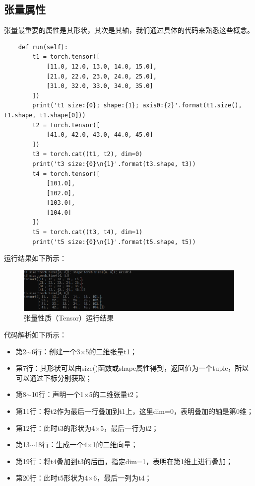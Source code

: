 \documentclass[UTF8]{article}
\begin{document}
\subsection{张量属性}
张量最重要的属性是其形状，其次是其轴，我们通过具体的代码来熟悉这些概念。
\begin{lstlisting}
    def run(self):
        t1 = torch.tensor([
            [11.0, 12.0, 13.0, 14.0, 15.0],
            [21.0, 22.0, 23.0, 24.0, 25.0],
            [31.0, 32.0, 33.0, 34.0, 35.0]
        ])
        print('t1 size:{0}; shape:{1}; axis0:{2}'.format(t1.size(), t1.shape, t1.shape[0]))
        t2 = torch.tensor([
            [41.0, 42.0, 43.0, 44.0, 45.0]
        ])
        t3 = torch.cat((t1, t2), dim=0)
        print('t3 size:{0}\n{1}'.format(t3.shape, t3))
        t4 = torch.tensor([
            [101.0],
            [102.0],
            [103.0],
            [104.0]
        ])
        t5 = torch.cat((t3, t4), dim=1)
        print('t5 size:{0}\n{1}'.format(t5.shape, t5))
\end{lstlisting}
运行结果如下所示：
\begin{figure}[H]
	\caption{张量性质（Tensor）运行结果}
	\label{f000003}
	\centering
	\includegraphics[width=15cm]{images/f000003}
\end{figure}
代码解析如下所示：
\begin{itemize}
\item 第2$\sim$6行：创建一个3$\times$5的二维张量t1；
\item 第7行：其形状可以由size()函数或shape属性得到，返回值为一个tuple，所以可以通过下标分别获取；
\item 第8$\sim$10行：声明一个1$\times$5的二维张量t2；
\item 第11行：将t2作为最后一行叠加到t1上，这里dim=0，表明叠加的轴是第0维；
\item 第12行：此时t3的形状为4$\times$5，最后一行为t2；
\item 第13$\sim$18行：生成一个4$\times$1的二维向量；
\item 第19行：将t4叠加到t3的后面，指定dim=1，表明在第1维上进行叠加；
\item 第20行：此时t5形状为4$\times$6，最后一列为t4；
\end{itemize}
\end{document}
